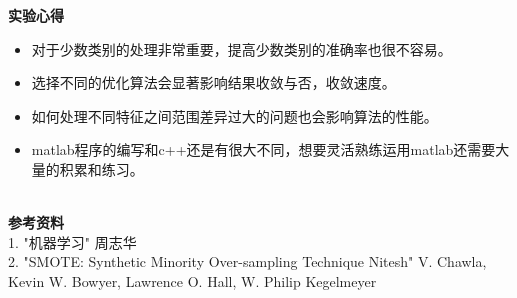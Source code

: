\documentclass[a4paper,UTF8]{article}
\numberwithin{equation}{section}
\begin{document}
\noindent\textbf{实验心得}\\
\begin{itemize}
\item 对于少数类别的处理非常重要，提高少数类别的准确率也很不容易。
\item 选择不同的优化算法会显著影响结果收敛与否，收敛速度。 
\item 如何处理不同特征之间范围差异过大的问题也会影响算法的性能。
\item matlab程序的编写和c++还是有很大不同，想要灵活熟练运用matlab还需要大量的积累和练习。
\end{itemize}
~\\
\noindent\textbf{参考资料}\\
1. "机器学习" 周志华\\
2. "SMOTE: Synthetic Minority Over-sampling Technique Nitesh" V. Chawla, Kevin W. Bowyer, Lawrence O. Hall, W. Philip Kegelmeyer\\
\end{document}
